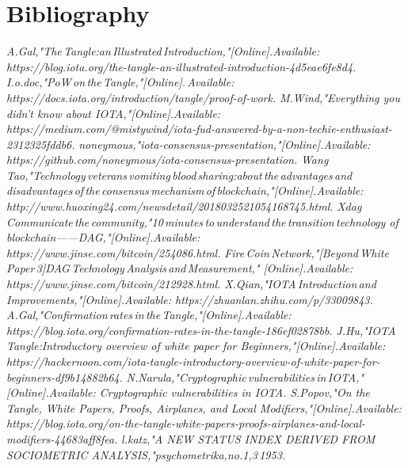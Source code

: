 \documentclass{article}
\begin{document}
\section{Bibliography}
\begin{thebibliography}{ } 
	\textit{A.Gal,"The\,Tangle:an\,Illustrated\,Introduction,"[Online].Available: https://blog.iota.org/the-tangle-an-illustrated-introduction-4d5eae6fe8d4.}
	\textit{I.o.doc,"PoW\,on\,the\,Tangle,"[Online].\,Available: https://docs.iota.org/introduction/tangle/proof-of-work.}	
	\textit{M.Wind,"Everything you didn’t know about IOTA,"[Online].Available: https://medium.com/@mistywind/iota-fud-answered-by-a-non-techie-enthusiast-2312325fddb6.}
	\textit{noneymous,"iota-consensus-presentation,"[Online].Available: https://github.com/noneymous/iota-consensus-presentation.}
	\textit{Wang\,Tao,"Technology\,veterans\,vomiting\,blood\,sharing:about\,the\,advantages\,and disadvantages\,of\,the\,consensus\,mechanism\,of\,blockchain,"[Online].Available: http://www.huoxing24.com/newsdetail/2018032521054168745.html.}
	\textit{Xdag\,Communicate\,the\,community,"10\,minutes\,to\,understand\,the\,transition\,technology of\,blockchain——DAG,"[Online].Available: https://www.jinse.com/bitcoin/254086.html.}
	\textit{Fire\,Coin\,Network,"[Beyond\,White\,Paper\,3]DAG\,Technology\,Analysis\,and\,Measurement," [Online].Available: https://www.jinse.com/bitcoin/212928.html.}
	\textit{X.Qian,"IOTA\,Introduction\,and\,Improvements,"[Online].Available: https://zhuanlan.zhihu.com/p/33009843.}
	\textit{A.Gal,"Confirmation\,rates\,in\,the\,Tangle,"[Online].Available: https://blog.iota.org/confirmation-rates-in-the-tangle-186ef02878bb.}
	\textit{J.Hu,"IOTA Tangle:Introductory overview of white paper for Beginners,"[Online].Available: https://hackernoon.com/iota-tangle-introductory-overview-of-white-paper-for-beginners-df9b14882b64.}
	\textit{N.Narula,"Cryptographic\,vulnerabilities\,in\,IOTA,"[Online].Available: Cryptographic vulnerabilities in IOTA.}
	\textit{S.Popov,"On the Tangle, White Papers, Proofs, Airplanes, and Local Modifiers,"[Online].Available: https://blog.iota.org/on-the-tangle-white-papers-proofs-airplanes-and-local-modifiers-44683aff8fea.}
	\textit{l.katz,"A NEW STATUS INDEX DERIVED FROM SOCIOMETRIC ANALYSIS,"psychometrika,no.1,3\,1953.}

\end{thebibliography}
\end{document}
